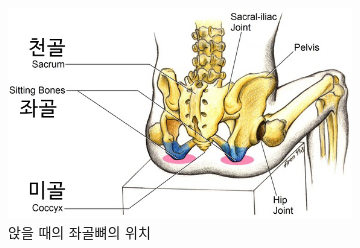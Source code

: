     \begin{figure}[h]
         \centering
         \begin{subfigure}[b]{0.3\textwidth}
             \centering
             \includegraphics[width=\textwidth]{figures/sit.png}
             \caption{앉을 때의 좌골뼈의 위치}
             \label{fig:sit}
         \end{subfigure}
         \hfill
         \begin{subfigure}[b]{0.3\textwidth}
             \centering

\end{subfigure}
\end{figure}
